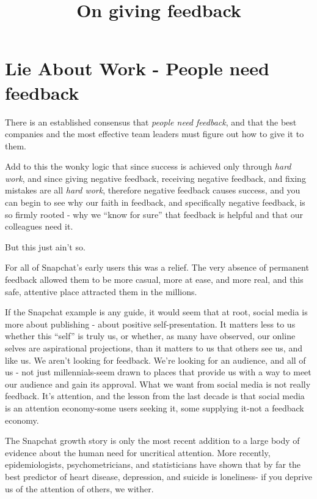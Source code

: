 \documentclass[ebook,12pt,oneside,openany]{memoir}
\begin{document}
\title{On giving feedback}
\maketitle
\section{Lie About Work - People need feedback}

There is an established consensus that \textit{people need feedback},
and that the best companies and the most effective team leaders must figure
out how to give it to them.

Add to this the wonky logic that since success is achieved 
only through \textit{hard work}, and since giving negative feedback,
receiving negative feedback, and fixing mistakes are all \textit{hard work},
therefore negative feedback causes success, and you can begin to see why 
our faith in feedback, and specifically negative feedback, is so firmly rooted - why
we ``know for sure'' that feedback is helpful and that our colleagues need it.
 
But this just ain't so.

For all of Snapchat's early users this was a relief. The very absence
of permanent feedback allowed them to be more casual, more at ease,
and more real, and this safe, attentive place attracted them in the millions.

If the Snapchat example is any guide, it would seem that at root, social media 
is more about publishing - about positive self-presentation.
It matters less to us whether this ``self'' is truly us, or whether, 
as many have observed, our online selves are aspirational projections,
than it matters to us that others see us, and like us. 
We aren't looking for feedback. We're looking for an audience, and all of us -
not just millennials-seem drawn to places that provide us with a way to meet our audience
and gain its approval.
What we want from social media is not really feedback. It's attention, and the lesson
from the last decade is that social media is an attention economy-some users seeking it, 
some supplying it-not a feedback economy.

The Snapchat growth story is only the most recent addition to a large 
body of evidence about the human need for uncritical attention.
More recently, epidemiologists, psychometricians, and statisticians have shown
that by far the best predictor of heart disease, depression, and suicide is loneliness-
if you deprive us of the attention of others, we wither.
\end{document}
